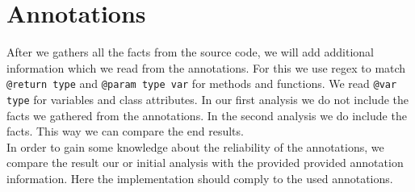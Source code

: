\documentclass[../main.tex]{subfiles}
\begin{document}
    \section{Annotations}\label{sec:annotations}
    After we gathers all the facts from the source code, we will add additional information which we read from the annotations.
    For this we use regex to match \texttt{@return type} and \texttt{@param type var} for methods and functions.
    We read \texttt{@var type} for variables and class attributes.
    In our first analysis we do not include the facts we gathered from the annotations. 
    In the second analysis we do include the facts.
    This way we can compare the end results.
    \\
    In order to gain some knowledge about the reliability of the annotations, we compare the result our or initial analysis with the provided provided annotation information.
    Here the implementation should comply to the used annotations.
        
\end{document}
